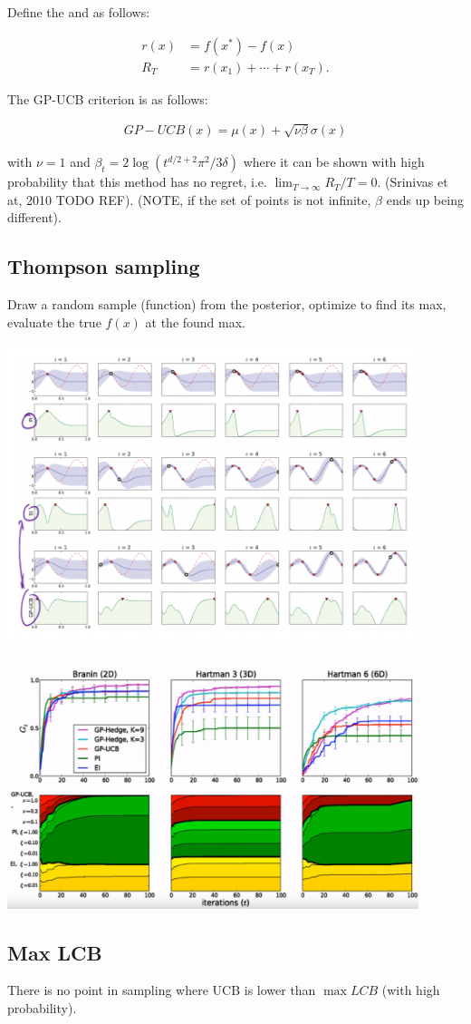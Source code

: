 Define the  and  as follows:

\begin{align}
    r(x) &= f(x^*) - f(x) \\
    R_T &= r(x_1) + \cdots + r(x_T).
\end{align}

The GP-UCB criterion is as follows:

\begin{align}
    GP-UCB(x) = \mu(x) + \sqrt{\nu \beta} \sigma(x)
\end{align}

with $\nu = 1$ and $\beta_t = 2 \log(t^{d/2 + 2}\pi^2 / 3 \delta)$ where it can be shown with high probability that this method has no regret, i.e. $\lim_{T \rightarrow \infty} R_T / T = 0$. (Srinivas et at, 2010 TODO REF). (NOTE, if the set of points is not infinite, $\beta$ ends up being different).


\subsection{Thompson sampling}

Draw a random sample (function) from the posterior, optimize to find its max, evaluate the true $f(x)$ at the found max.

\includegraphics[width=0.9\textwidth]{img/acquisition-functions.png}

\includegraphics[width=0.9\textwidth]{img/portfolios-of-acquisition-functions.png}


\subsection{Max LCB}

There is no point in sampling where UCB is lower than $\max LCB$ (with high probability).